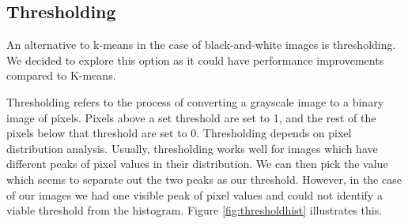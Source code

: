 \subsection{Thresholding}

An alternative to k-means in the case of black-and-white images is thresholding. We decided to explore this option as it could have performance improvements compared to K-means.

Thresholding refers to the process of converting a grayscale image to a binary image of pixels. Pixels above a set threshold are set to 1, and the rest of the pixels below that threshold are set to 0. Thresholding depends on pixel distribution analysis. Usually, thresholding works well for images which have different peaks of pixel values in their distribution. We can then pick the value which seems to separate out the two peaks as our threshold. However, in the case of our images we had one visible peak of pixel values and could not identify a viable threshold from the histogram. Figure \ref{fig:thresholdhist} illustrates this.

